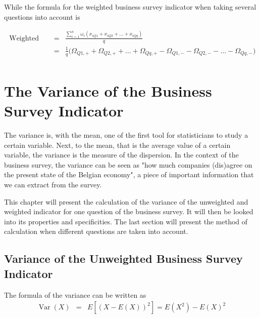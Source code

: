 \documentclass[12pt,a4paper,oneside]{book}
\DeclareMathOperator{\Var}{Var}
\begin{document}
While the formula for the weighted business survey indicator when taking several questions into account is

\begin{eqnarray}
    \mbox{ Weighted BSI} &=& \frac{\sum^n_{i=1} \omega_i \left( x_{iQ1} + x_{iQ2} +\ldots + x_{iQq} \right)}{q} \\    
    &=& \frac{1}{q} \big( \Omega_{Q1,+} + \Omega_{Q2,+} + \ldots + \Omega_{Qq,+} - \Omega_{Q1,-} - \Omega_{Q2,-} - \ldots - \Omega_{Qq,-} \big) \nonumber\\
\end{eqnarray}





\chapter{The Variance of the Business Survey Indicator}

The variance is, with the mean, one of the first tool for statisticians to study a certain variable. 
Next, to the mean, that is the average value of a certain variable, the variance is the measure of the dispersion. 
In the context of the business survey, the variance can be seen as "how much companies (dis)agree on the present state of the Belgian economy", a piece of important information that we can extract from the survey.


This chapter will present the calculation of the variance of the unweighted and weighted indicator for one question of the business survey. It will then be looked into its properties and specificities.
The last section will present the method of calculation when different questions are taken into account.

\section{Variance of the Unweighted Business Survey Indicator}

\nocite{alcaniz_calculation_2006}

The formula of the variance can be written as 
\begin{eqnarray}
         \Var(X) &=& E \left[ \left(X-E(X) \right)^2 \right] =  E\left( X^2\right) - E\left( X\right)^2 \\ \nonumber
\end{eqnarray}
\end{document}
